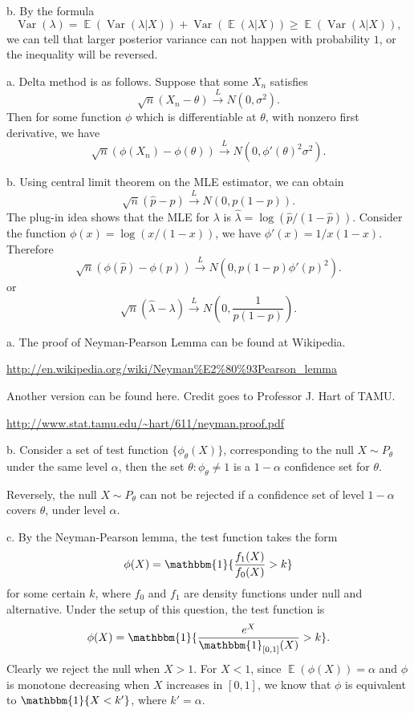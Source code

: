 \documentclass[12pt]{article}
\newcommand{\1}{\mathbbm{1}}
\newenvironment{problem}[2][Problem]{\begin{trivlist}
\item[\hskip \labelsep {\bfseries #1}\hskip \labelsep {\bfseries #2.}]}{\end{trivlist}}
\newcommand{\E}{\operatorname{\mathbb{E}}}
\newcommand{\var}[1]{\operatorname{Var}\left(#1\right)}
\begin{document}
b. By the formula
$$
\var{\lambda} = \E (\var{\lambda|X}) + \var{\E (\lambda|X)} \geq \E (\var{\lambda|X}),
$$
we can tell that larger posterior variance can not happen with probability $1$, or the inequality will be reversed.

\begin{problem}{3}
\end{problem}

a. Delta method is as follows. Suppose that some $X_n$ satisfies
$$
\sqrt{n}(X_n - \theta) \xrightarrow{L} N(0,\sigma^2) .
$$
Then for some function $\phi$ which is differentiable at $\theta$, with nonzero first derivative, we have
$$
\sqrt{n}(\phi(X_n) - \phi(\theta)) \xrightarrow{L} N(0,\phi'(\theta)^2\sigma^2) .
$$

b. Using central limit theorem on the MLE estimator, we can obtain
$$
\sqrt{n}(\hat{p} - p) \xrightarrow{L} N(0,p(1-p)).
$$
The plug-in idea shows that the MLE for $\lambda$ is $\hat{\lambda} = \log (\hat{p} / (1- \hat{p}))$. Consider the function $\phi(x) = \log (x /(1-x))$, we have $\phi'(x) = 1/x(1-x)$. Therefore
$$
\sqrt{n}(\phi(\hat{p}) - \phi(p)) \xrightarrow{L} N(0,p(1-p)\phi'(p)^2).
$$
or
$$
\sqrt{n}(\hat{\lambda} - \lambda) \xrightarrow{L} N(0,\frac{1}{p(1-p)}).
$$

\begin{problem}{4}
\end{problem}

a. The proof of Neyman-Pearson Lemma can be found at Wikipedia.

\url{http://en.wikipedia.org/wiki/Neyman%E2%80%93Pearson_lemma}

Another version can be found here. Credit goes to Professor J. Hart of TAMU.

\url{http://www.stat.tamu.edu/~hart/611/neyman.proof.pdf}

b. Consider a set of test function $\{\phi_\theta(X)\}$, corresponding to the null $X \sim  P_\theta$ under the same level $\alpha$, then the set ${\theta : \phi_\theta \neq 1}$ is a $1-\alpha$ confidence set for $\theta$.

Reversely, the null $X \sim  P_\theta$ can not be rejected if a confidence set of level $1-\alpha$ covers $\theta$, under level $\alpha$.

c. By the Neyman-Pearson lemma, the test function takes the form
$$
\phi(X) = \1 \{\frac{f_1(X)}{f_0(X)} > k \}
$$
for some certain $k$, where $f_0$ and $f_1$ are density functions under null and alternative. Under the setup of this question, the test function is
$$
\phi(X) = \1 \{\frac{e^X}{\1_{[0,1]}(X)} > k \}.
$$
Clearly we reject the null when $X>1$. For $X<1$, since $\E (\phi(X)) = \alpha$ and $\phi$ is monotone decreasing when $X$ increases in $[0,1]$, we know that $\phi$ is equivalent to $\1 \{ X <k'\}$, where $k' = \alpha$. 
\end{document}
